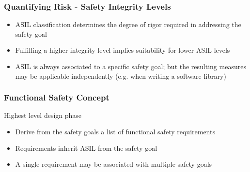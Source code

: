 \documentclass[aspectratio=169]{beamer}
\newif\iftransitions
\newcommand{\cpause}{\iftransitions \pause \fi}
\begin{document}
\begin{frame}
  \frametitle{Quantifying Risk - Safety Integrity Levels}
  
  \begin{itemize}
  \item ASIL classification determines the degree of rigor required in addressing the safety goal \cpause
  \item Fulfilling a higher integrity level implies suitability for lower ASIL levels \cpause
  \item ASIL is always associated to a specific safety goal; but the resulting measures may be applicable independently (e.g. when writing a software library)
  \end{itemize}
\end{frame}

\begin{frame}
  \frametitle{Functional Safety Concept}
  
  Highest level design phase \cpause
  \begin{itemize}
  \item Derive from the safety goals a list of functional safety requirements \cpause
  \item Requirements inherit ASIL from the safety goal \cpause
  \item A single requirement may be associated with multiple safety goals
  \end{itemize}
  
\end{frame}
\end{document}
